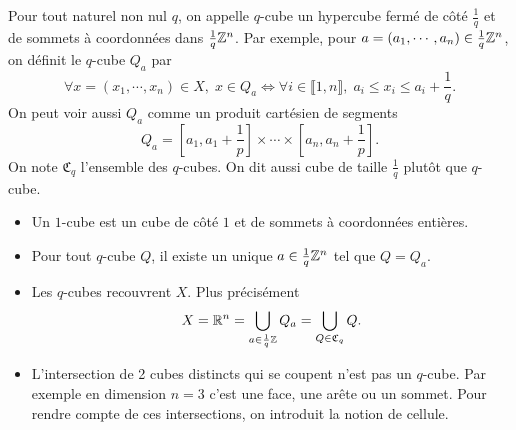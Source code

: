 \begin{defi}[q-cube]\label{q-cube}
Pour tout naturel non nul $q$, on appelle $q$-cube un hypercube fermé de côté $\frac{1}{q}$ et de sommets à coordonnées dans $\frac{1}{q}\mathbb{Z}^n$.\newline
Par exemple, pour $a = (a_1, \cdots, a_n) \in \frac{1}{q}\mathbb{Z}^n$, on définit le $q$-cube $Q_a$ par
\begin{displaymath}
 \forall x = (x_1, \cdots, x_n) \in X, \; x \in Q_a  \Leftrightarrow \forall i \in \llbracket 1,n \rrbracket,\; a_i \leq x_i \leq a_i + \frac{1}{q}.
\end{displaymath}
On peut voir aussi $Q_a$ comme un produit cartésien de segments
\begin{displaymath}
 Q_a = [a_1, a_1+\frac{1}{p}] \times \cdots \times [a_n, a_n+\frac{1}{p}].
\end{displaymath}
On note $\mathfrak{C}_q$ l'ensemble des $q$-cubes. On dit aussi cube de taille $\frac{1}{q}$ plutôt que $q$-cube.
\end{defi}
\begin{rems}
 \begin{itemize}
  \item Un $1$-cube est un cube de côté $1$ et de sommets à coordonnées entières.
  \item Pour tout $q$-cube $Q$, il existe un unique $a\in \frac{1}{q}\mathbb{Z}^n$ tel que $Q=Q_a$.
  \item Les $q$-cubes recouvrent $X$. Plus précisément
  \begin{displaymath}
     X = \mathbb{R}^n = \bigcup_{a\in \frac{1}{q}\mathbb{Z}}Q_a = \bigcup_{Q\in \mathfrak{C}_q}Q.
  \end{displaymath}
  \item L'intersection de 2 cubes distincts qui se coupent n'est pas un $q$-cube. Par exemple en dimension $n=3$ c'est une face, une arête ou un sommet. Pour rendre compte de ces intersections, on introduit la notion de cellule.
 \end{itemize}
\end{rems}

